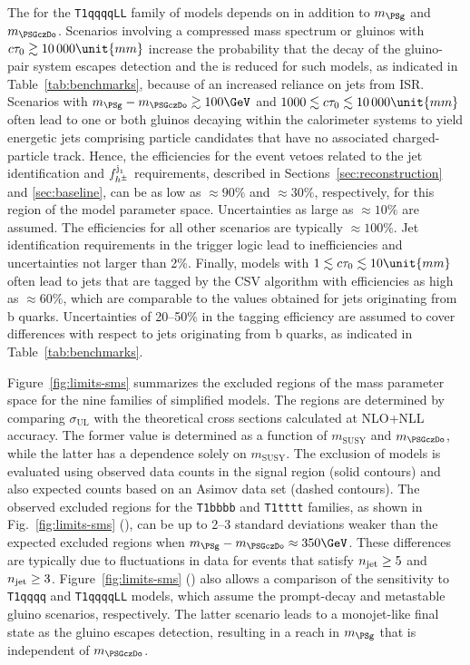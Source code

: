 The \ate for the \texttt{T1qqqqLL} family of models depends on \ctau
in addition to $m_\PSg$ and $m_{\PSGczDo}$. Scenarios involving a
compressed mass spectrum or gluinos with $\ctau \gtrsim
10\,000\unit{mm}$ increase the probability that the decay of the
gluino-pair system escapes detection and the \ate is reduced for such
models, as indicated in Table~\ref{tab:benchmarks}, because of an
increased reliance on jets from ISR. Scenarios with $m_\PSg -
m_{\PSGczDo} \gtrsim 100\GeV$ and $1000 \lesssim \ctau \lesssim
10\,000\unit{mm}$ often lead to one or both gluinos decaying within
the calorimeter systems to yield energetic jets comprising particle
candidates that have no associated charged-particle track. Hence, the
efficiencies for the event vetoes related to the jet identification
and $f_{h^{\pm}}^{\jet{1}}$ requirements, described in
Sections~\ref{sec:reconstruction} and \ref{sec:baseline}, can be as
low as ${\approx}90\%$ and ${\approx}30\%$, respectively, for this
region of the model parameter space. Uncertainties as large as
${\approx}10\%$ are assumed. The efficiencies for all other scenarios
are typically ${\approx}100\%$. Jet identification requirements in the
trigger logic lead to inefficiencies and uncertainties not larger than
2\%. Finally, models with $1 \lesssim \ctau \lesssim 10\unit{mm}$
often lead to jets that are tagged by the CSV algorithm with
efficiencies as high as ${\approx}60\%$, which are comparable to the
values obtained for jets originating from b quarks. Uncertainties of
20--50\% in the tagging efficiency are assumed to cover differences
with respect to jets originating from b quarks, as indicated in
Table~\ref{tab:benchmarks}.

Figure~\ref{fig:limits-sms} summarizes the excluded regions of the
mass parameter space for the nine families of simplified models. The
regions are determined by comparing $\sigma_\text{UL}$
with the theoretical cross sections calculated at NLO+NLL accuracy.
The former value is determined as a function of $m_{\text{SUSY}}$ and
$m_{\PSGczDo}$, while the latter has a dependence solely on
$m_{\text{SUSY}}$. The exclusion of models is evaluated using observed
data counts in the signal region (solid contours) and also expected
counts based on an Asimov data set (dashed contours). The observed
excluded regions for the \texttt{T1bbbb} and \texttt{T1tttt} families,
as shown in Fig.~\ref{fig:limits-sms} (\cmsRight), can be up to 2--3
standard deviations weaker than the expected excluded regions when
$m_{\PSg} - m_{\PSGczDo} \approx 350\GeV$. These differences are
typically due to fluctuations in data for events that satisfy $\njet
\geq 5$ and $\njet \geq 3$. Figure~\ref{fig:limits-sms} (\cmsRight)
also allows a comparison of the sensitivity to \texttt{T1qqqq} and
\texttt{T1qqqqLL} models, which assume the prompt-decay and metastable
gluino scenarios, respectively. The latter scenario leads to a
monojet-like final state as the gluino escapes detection, resulting in
a reach in $m_\PSg$ that is independent of $m_{\PSGczDo}$.

